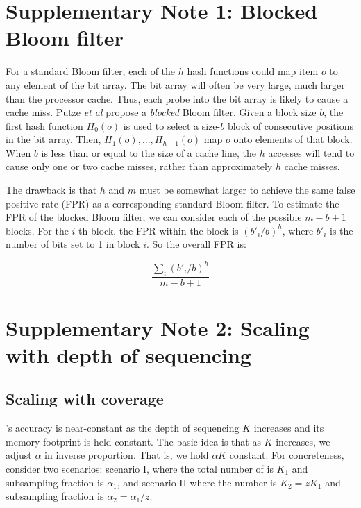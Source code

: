 \documentclass[10pt]{article}
\begin{document}

\section*{Supplementary Note 1: Blocked Bloom filter}

For a standard Bloom filter, each of the $h$ hash functions could map item $o$ to any element of the bit array. The bit array will often be very large, much larger than the processor cache.  Thus, each probe into the bit array is likely to cause a cache miss. Putze \emph{et al} \cite{Putze:2010:CHS:1498698.1594230} propose a \emph{blocked} Bloom filter. Given a block size $b$, the first hash function $H_0(o)$ is used to select a size-$b$ block of consecutive positions in the bit array.  Then, $H_1(o),...,H_{h-1}(o)$ map $o$ onto elements of that block. When $b$ is less than or equal to the size of a cache line, the $h$ accesses will tend to cause only one or two cache misses, rather than approximately $h$ cache misses.

The drawback is that $h$ and $m$ must be somewhat larger to achieve the same false positive rate (FPR) as a corresponding standard Bloom filter.  To estimate the FPR of the blocked Bloom filter, we can consider each of the possible $m-b+1$ blocks. For the $i$-th block, the FPR within the block is $(b'_i/b)^h$, where $b'_i$ is the number of bits set to 1 in block $i$. So the overall FPR is:

$$\frac{\sum_i (b'_i/b)^h}{m-b+1}$$

\section*{Supplementary Note 2: Scaling with depth of sequencing}

\subsection*{Scaling with coverage}
\tool's accuracy is near-constant as the depth of sequencing $K$ increases and its memory footprint is held constant.  The basic idea is that as $K$ increases, we adjust $\alpha$ in inverse proportion.  That is, we hold $\alpha K$ constant.  For concreteness, consider two scenarios: scenario I, where the total number of \kmers is $K_1$ and subsampling fraction is $\alpha_1$, and scenario II where the number is $K_2=z K_1$ and subsampling fraction is $\alpha_2 = \alpha_1 / z$.
\end{document}
